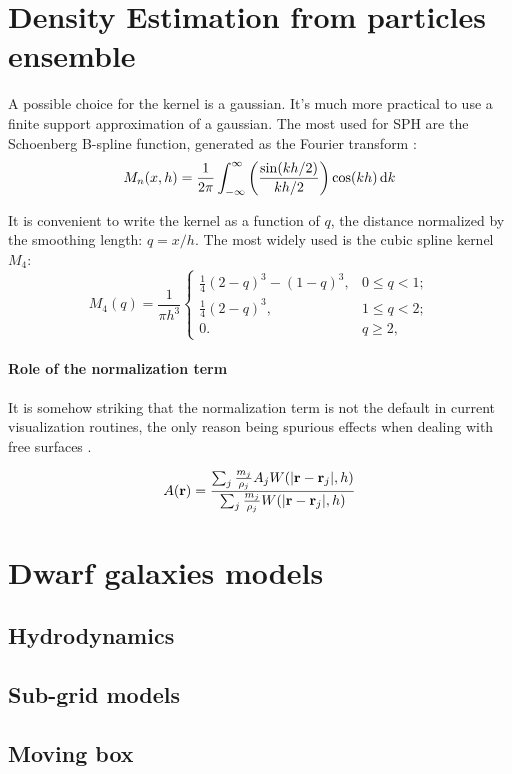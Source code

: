 \section{Density Estimation from particles ensemble}
A possible choice for the kernel is a gaussian.
It's much more practical to use a finite support approximation of a gaussian.
The most used for SPH are the Schoenberg \cite{Schoenberg1988} B-spline function, generated as the Fourier transform %
\citep{Price2012}:
\begin{equation}
M_n(x, h) = \frac{1}{2\pi}\int_{-\infty}^{\infty}{\left(\frac{\sin(kh/2)}{kh/2}\right)\cos(kh)\operatorname{d}\!{k}}
\end{equation}

It is convenient to write the kernel as a function of $q$, the distance normalized by the smoothing length: $q=x/h$.
The most widely used is the cubic spline kernel $M_4$:
\begin{equation}
M_4(q) = \frac{1}{\pi h^3} \left\{ \begin{array}{ll}
\frac{1}{4}(2-q)^3 - (1 - q)^{3}, & 0 \le q < 1; \\
\frac{1}{4}(2-q)^3, & 1 \le q < 2; \\
0. & q \ge 2, \end{array} \right. \label{eq:cubicspline}
\end{equation}

\paragraph{Role of the normalization term}
It is somehow striking that the normalization term is not the default in current visualization routines, the only reason being spurious effects when dealing with free surfaces \citep{Price2007}.

\begin{equation}
 A(\boldsymbol{\mathbf{r}}) = \dfrac{\sum_j \frac{m_j}{\rho_j} A_j W(|\boldsymbol{\mathbf{r}} - \boldsymbol{\mathbf{r}}_j|,h)}{\sum_j \frac{m_j}{\rho_j} W(|\boldsymbol{\mathbf{r}} - \boldsymbol{\mathbf{r}}_j|,h)}
\end{equation}


\section{Dwarf galaxies models}
\citet{Verbeke2017}
\subsection{Hydrodynamics}
\subsection{Sub-grid models}
\subsection{Moving box}
\citet{Nichols2015}
\citet{Hausammann2019}

